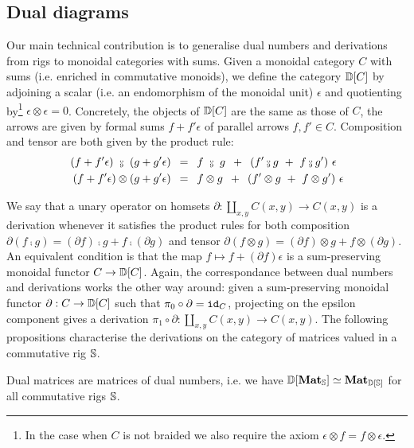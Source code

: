 
\subsection{Dual diagrams}\label{2-dual-diagrams}

Our main technical contribution is to generalise dual numbers and derivations from rigs to monoidal categories with sums.
Given a monoidal category $C$ with sums (i.e. enriched in commutative monoids), we define the category $\D[C]$ by adjoining a scalar (i.e. an endomorphism of the monoidal unit) $\epsilon$ and quotienting by\footnote{
In the case when $C$ is not braided we also require the axiom $\epsilon \otimes f = f \otimes \epsilon$.
} $\epsilon \otimes \epsilon = 0$.
Concretely, the objects of $\D[C]$ are the same as those of $C$, the arrows
are given by formal sums $f + f' \epsilon$ of parallel arrows $f, f' \in C$.
Composition and tensor are both given by the product rule:
\begin{align}
    (f + f' \epsilon) \ \fcmp \ (g + g' \epsilon)
    &\s = \s f \ \fcmp \ g \s + \s (f' \fcmp g \ + \ f \fcmp g') \ \epsilon\\
    (f + f' \epsilon) \otimes (g + g' \epsilon)
    &\s = \s f \otimes g \s + \s (f' \otimes g \ + \ f \otimes g') \ \epsilon
\end{align}

We say that a unary operator on homsets $\partial : \coprod_{x,y} C(x, y) \to C(x, y)$ is a derivation whenever it satisfies the product rules for both composition
$\partial (f \fcmp g) = (\partial f) \fcmp g + f \fcmp (\partial g)$ and tensor
$\partial (f \otimes g) = (\partial f) \otimes g + f \otimes (\partial g)$.
An equivalent condition is that the map $f \mapsto f + (\partial f) \epsilon$ is a sum-preserving monoidal functor $C \to \D[C]$.
Again, the correspondance between dual numbers and derivations works the other way around: given a sum-preserving monoidal functor $\partial : C \to \D[C]$ such that
$\pi_0 \circ \partial = \id_{C}$, projecting on the epsilon component gives a derivation $\pi_1 \circ \partial : \coprod_{x,y} C(x, y) \to C(x, y)$.
The following propositions characterise the derivations on the category of matrices valued in a commutative rig $\S$.

\begin{proposition}
Dual matrices are matrices of dual numbers, i.e. we have $\D[\mathbf{Mat}_\S] \simeq \mathbf{Mat}_{\D[\S]}$ for all commutative rigs $\S$.
\end{proposition}

